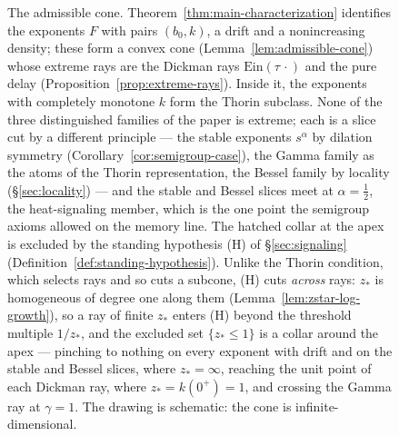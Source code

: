 \begin{figure}[t]
\begin{tikzpicture}[every node/.style={font=\small}, line cap=round, >=stealth]
\end{tikzpicture}
\caption{The admissible cone. Theorem~\ref{thm:main-characterization} identifies the
exponents $F$ with pairs $(b_0, k)$, a drift and a nonincreasing density; these form a convex
cone (Lemma~\ref{lem:admissible-cone}) whose extreme rays are the Dickman rays
$\mathrm{Ein}(\tau\,\cdot)$ and the pure delay (Proposition~\ref{prop:extreme-rays}). Inside
it, the exponents with completely monotone $k$ form the Thorin subclass. None of the three
distinguished families of the paper is extreme; each is a slice cut by a different principle
--- the stable exponents $s^\alpha$ by dilation symmetry (Corollary~\ref{cor:semigroup-case}),
the Gamma family as the atoms of the Thorin representation, the Bessel family by locality
(\S\ref{sec:locality}) --- and the stable and Bessel slices meet at $\alpha = \tfrac12$, the
heat-signaling member, which is the one point the semigroup axioms allowed on the memory
line. The hatched collar at the apex is excluded by the standing hypothesis (H) of
\S\ref{sec:signaling} (Definition~\ref{def:standing-hypothesis}). Unlike the Thorin
condition, which selects rays and so cuts a subcone, (H) cuts \emph{across} rays: $z_*$ is
homogeneous of degree one along them (Lemma~\ref{lem:zstar-log-growth}), so a ray of finite
$z_*$ enters (H) beyond the threshold multiple $1/z_*$, and the excluded set
$\{z_* \le 1\}$ is a collar around the apex --- pinching to nothing on every exponent with
drift and on the stable and Bessel slices, where $z_* = \infty$, reaching the unit point of
each Dickman ray, where $z_* = k(0^+) = 1$, and crossing the Gamma ray at $\gamma = 1$. The
drawing is schematic: the cone is infinite-dimensional.}
\label{fig:admissible-cone}
\end{figure}
